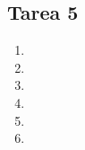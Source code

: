 \documentclass{report}
\begin{document}
	

	\begin{center}
		{\let\newpage\relax\chapter*{Tarea 5}}
	\end{center}


    \begin{enumerate}%
        \item 
        \item 
        \item 
        \item 
        \item 
        \item 
    \end{enumerate}
    \newpage
    
  
\end{document}
